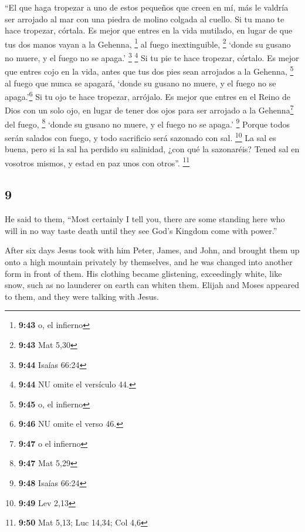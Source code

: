 \begin{paracol}{2}
 ``El que haga tropezar a uno de estos pequeños que creen
en mí, más le valdría ser arrojado al mar con una piedra de molino
colgada al cuello.  Si tu mano te hace tropezar, córtala.
Es mejor que entres en la vida mutilado, en lugar de que tus dos manos
vayan a la Gehenna, \footnote{\textbf{9:43} o, el infierno} al fuego
inextinguible, \footnote{\textbf{9:43} Mat 5,30}  `donde
su gusano no muere, y el fuego no se apaga.' \footnote{\textbf{9:44}
  Isaías 66:24} \footnote{\textbf{9:44} NU omite el versículo 44.}
 Si tu pie te hace tropezar, córtalo. Es mejor que entres
cojo en la vida, antes que tus dos pies sean arrojados a la Gehenna,
\footnote{\textbf{9:45} o, el infierno} al fuego que nunca se apagará,
 `donde su gusano no muere, y el fuego no se
apaga.'\footnote{\textbf{9:46} NU omite el verso 46.}  Si
tu ojo te hace tropezar, arrójalo. Es mejor que entres en el Reino de
Dios con un solo ojo, en lugar de tener dos ojos para ser arrojado a la
Gehenna\footnote{\textbf{9:47} o el infierno} del fuego, \footnote{\textbf{9:47}
  Mat 5,29}  `donde su gusano no muere, y el fuego no se
apaga.' \footnote{\textbf{9:48} Isaías 66:24}  Porque
todos serán salados con fuego, y todo sacrificio será sazonado con sal.
\footnote{\textbf{9:49} Lev 2,13}  La sal es buena, pero
si la sal ha perdido su salinidad, ¿con qué la sazonaréis? Tened sal en
vosotros mismos, y estad en paz unos con otros''. \footnote{\textbf{9:50}
  Mat 5,13; Luc 14,34; Col 4,6}

\switchcolumn
\begin{otherlanguage}{english}

\hypertarget{section-17}{%
\section{9}\label{section-17}}

 He said to them, ``Most certainly I tell you, there are
some standing here who will in no way taste death until they see God's
Kingdom come with power.''

 After six days Jesus took with him Peter, James, and
John, and brought them up onto a high mountain privately by themselves,
and he was changed into another form in front of them. 
His clothing became glistening, exceedingly white, like snow, such as no
launderer on earth can whiten them.  Elijah and Moses
appeared to them, and they were talking with Jesus.


\end{otherlanguage}
\end{paracol}
